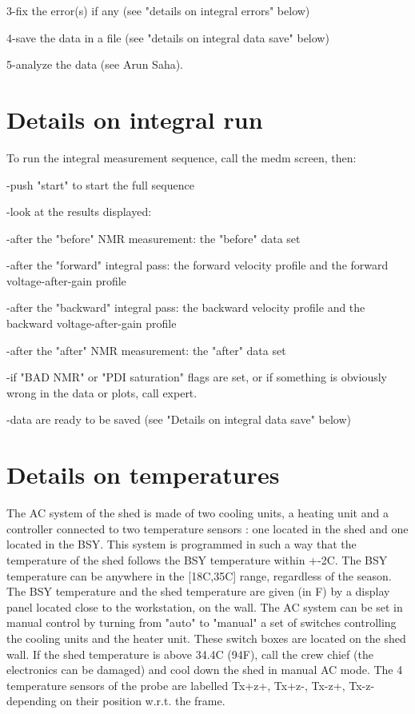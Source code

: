 {3-fix the error(s) if any (see "details on integral errors"
below) 

4-save the data in a file (see "details on integral data save"
below) 

5-analyze the data (see Arun Saha). 


\section{Details on integral run }

To run the integral measurement sequence, call the 
medm screen, then: 

-push "start" to start the full sequence 

-look at the results displayed: 

-after the "before" NMR measurement: the 
"before"
data set 

-after the "forward" integral pass: the forward velocity profile
and the forward voltage-after-gain profile 

-after the "backward" integral pass: the backward velocity
profile and the backward voltage-after-gain profile 

-after the "after" NMR measurement: the 
"after"
data set 

-if "BAD NMR" or "PDI saturation" flags
are set, or if something is obviously wrong in the data or plots, call expert. 

-data are ready to be saved (see "Details on integral data save"
below) 


\section{Details on temperatures }

The AC system of the shed is made of two cooling units, a heating unit and a
controller connected to two temperature sensors : one located in the shed and
one located in the BSY. This system is programmed in such a way that the 
temperature
of the shed follows the BSY temperature within +-2C. The BSY temperature can
be anywhere in the {[}18C,35C{]} range, regardless of the season. The BSY 
temperature
and the shed temperature are given (in F) by a display panel located close to
the workstation, on the wall. The AC system can be set in manual control by
turning from "auto" to "manual" a set of
switches controlling the cooling units and the heater unit. These switch boxes
are located on the shed wall. If the shed temperature is above 34.4C (94F),
call the crew chief (the electronics can be damaged) and cool down the shed in manual
AC mode. The 4 temperature sensors of the probe are labelled Tx+z+, Tx+z-, Tx-z+,
Tx-z- depending on their position w.r.t. the frame. 

}
